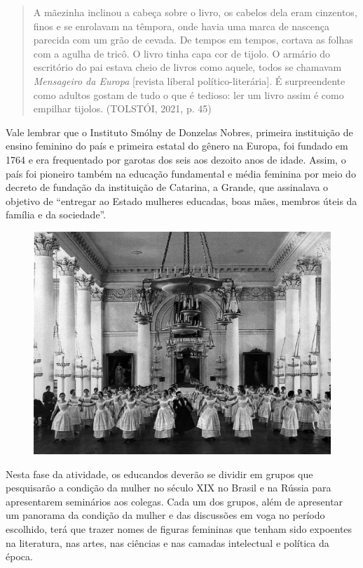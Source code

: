\documentclass{article}
\begin{document}
\begin{quote}
A mãezinha inclinou a cabeça sobre o livro, os cabelos dela eram
cinzentos, finos e se enrolavam na têmpora, onde havia uma marca de
nascença parecida com um grão de cevada. De tempos em tempos, cortava as
folhas com a agulha de tricô. O livro tinha capa cor de tijolo. O
armário do escritório do pai estava cheio de livros como aquele, todos
se chamavam \emph{Mensageiro da Europa} {[}revista liberal
político-literária{]}. É surpreendente como adultos gostam de tudo o que
é tedioso: ler um livro assim é como empilhar tijolos. (TOLSTÓI, 2021,
p. 45)
\end{quote}

Vale lembrar que o Instituto Smólny de Donzelas Nobres, primeira
instituição de ensino feminino do país e primeira estatal do gênero na
Europa, foi fundado em 1764 e era frequentado por garotas dos seis aos
dezoito anos de idade. Assim, o país foi pioneiro também na educação
fundamental e média feminina por meio do decreto de fundação da
instituição de Catarina, a Grande, que assinalava o objetivo de
``entregar ao Estado mulheres educadas, boas mães, membros úteis da
família e da sociedade''.

\begin{figure}[ht!]
\includegraphics[width=\textwidth]{./images/PNLD0049-15.png}
\end{figure}

Nesta fase da atividade, os educandos deverão se dividir em grupos que
pesquisarão a condição da mulher no século XIX no Brasil e na Rússia
para apresentarem seminários aos colegas. Cada um dos grupos, além de
apresentar um panorama da condição da mulher e das discussões em voga no
período escolhido, terá que trazer nomes de figuras femininas que tenham
sido expoentes na literatura, nas artes, nas ciências e nas camadas
intelectual e política da época.
\end{document}
